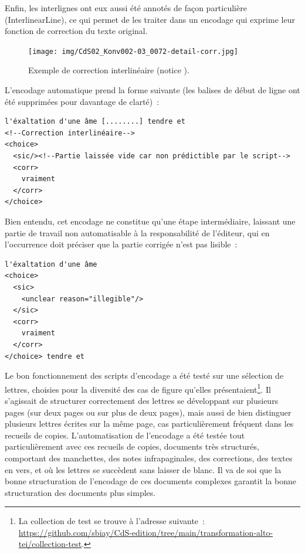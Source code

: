 \documentclass[a4paper,12pt,twoside]{book}
\begin{document}
			\normalsize
			Enfin, les interlignes ont eux aussi été annotés de façon particulière (\textsf{InterlinearLine}), ce qui permet de les traiter dans un encodage qui exprime leur fonction de correction du texte original.
			
			\begin{figure}[!h]
				\centering
				\texttt{[image: img/CdS02\_Konv002-03\_0072-detail-corr.jpg]}
				\caption{Exemple de correction interlinéaire (notice \cite{CdS02072}).}
				\label{}
			\end{figure}
		
			L'encodage automatique prend la forme suivante (les balises de début de ligne ont été supprimées pour davantage de clarté)~:
			
			\begin{verbatim}
l'éxaltation d'une âme [........] tendre et
<!--Correction interlinéaire-->
<choice>
  <sic/><!--Partie laissée vide car non prédictible par le script-->
  <corr>
    vraiment
  </corr>
</choice>
			\end{verbatim}
			
			Bien entendu, cet encodage ne constitue qu'une étape intermédiaire, laissant une partie de travail non automatisable à la responsabilité de l'éditeur, qui en l'occurrence doit préciser que la partie corrigée n'est pas lisible~:
			
			\begin{verbatim}
l'éxaltation d'une âme 
<choice>
  <sic>
    <unclear reason="illegible"/>
  </sic>
  <corr>
    vraiment
  </corr>
</choice> tendre et
			\end{verbatim}
		
			Le bon fonctionnement des scripts d'encodage a été testé sur une sélection de lettres, choisies pour la diversité des cas de figure qu'elles présentaient\footnote{La collection de test se trouve à l'adresse suivante~: \url{https://github.com/sbiay/CdS-edition/tree/main/transformation-alto-tei/collection-test}.}. Il s'agissait de structurer correctement des lettres se développant sur plusieurs pages (sur deux pages ou sur plus de deux pages), mais aussi de bien distinguer plusieurs lettres écrites sur la même page, cas particulièrement fréquent dans les recueils de copies. L'automatisation de l'encodage a été testée tout particulièrement avec ces recueils de copies, documents très structurés, comportant des manchettes, des notes infrapaginales, des corrections, des textes en vers, et où les lettres se succèdent sans laisser de blanc. Il va de soi que la bonne structuration de l'encodage de ces documents complexes garantit la bonne structuration des documents plus simples.
			
\end{document}
